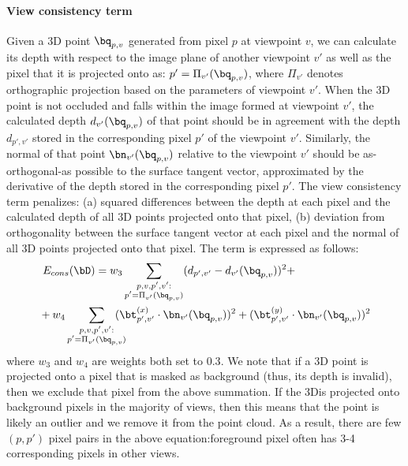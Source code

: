 \documentclass[10pt, conference, compsocconf]{IEEEtran}
\begin{document}
\vspace{-2mm}\paragraph{View consistency term} Given a 3D point $\bq_{p,v}$ generated from pixel $p$ at viewpoint $v$, we can calculate its depth with respect to the image plane of another viewpoint $v'$ as well as the pixel that it is projected onto as: $p'=\Pi_{v'}(\bq_{p,v})$, where $\Pi_{v'}$ denotes orthographic projection based on the  parameters of viewpoint $v'$.
When the 3D point is not occluded and falls within the  image formed at viewpoint $v'$, the calculated depth $d_{v'}(\bq_{p,v})$ of that point should be in agreement with the depth $d_{p',v'}$ stored in the corresponding pixel $p'$ of the viewpoint $v'$. Similarly, the  normal of that point  $\bn_{v'}(\bq_{p,v})$ relative to the viewpoint $v'$ should be as-orthogonal-as possible to  the surface tangent vector, approximated by the derivative of the depth stored in the corresponding pixel  $p'$. The view consistency term penalizes: (a) squared differences between the depth at each pixel and the calculated depth of all 3D points projected onto that pixel, (b) deviation from orthogonality between the surface tangent vector at each pixel and the normal of all 3D points projected onto that pixel. The term is expressed as follows:
\vspace{-1mm}\begin{align}
&\ E_{cons}(\bD) = w_3 \sum\limits_{\substack{p,v,p',v':\\p'=\Pi_{v'}(\bq_{p,v})}}  ( {d}_{p',v'} - d_{v'}(\bq_{p,v}) )^2 + \nonumber \\
& + w_4 \sum\limits_{\substack{p,v,p',v':\\p'=\Pi_{v'}(\bq_{p,v})}} 
\!\!\!\!\!\! ( \bt_{p',v'}^{(x)} \cdot \bn_{v'}(\bq_{p,v}))^2 + ( \bt_{p',v'}^{(y)} \cdot \bn_{v'}(\bq_{p,v} ))^2 \nonumber
\end{align}\vskip -2.5mm
where $w_3$ and $w_4$ are weights both set to $0.3$.
We note that if a 3D point is projected onto a pixel that is masked as background (thus, its depth is invalid), then we exclude that pixel from the above summation. If the 3D\point is projected onto background pixels in the majority of views, then this means that the point is likely an outlier and we remove it from the point cloud.
As a result, there are few $(p,p')$ pixel pairs in the above equation:\each foreground pixel often has 3-4 corresponding pixels in other views.
\end{document}
